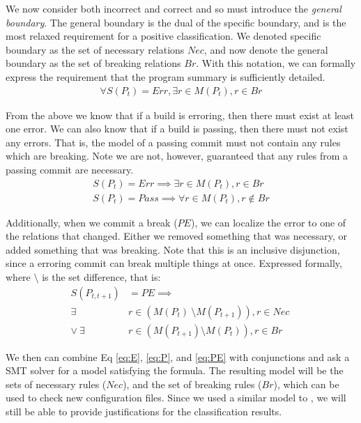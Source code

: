 We now consider both incorrect and correct 
and so must introduce the \textit{general boundary}.
The general boundary is the dual of the specific boundary, and is the most relaxed requirement for a positive classification.
We denoted specific boundary as the set of necessary relations $Nec$, and now denote the general boundary as the set of breaking relations $Br$.
With this notation, we can formally express the requirement that the program summary is sufficiently detailed.
\begin{align}
  \forall S(P_t)=Err, \exists r \in M(P_t), r \in Br \label{eq:E1}
\end{align}

From the above we know that if a build is erroring, then there must exist at least one error.
We can also know that if a build is passing, then there must not exist any errors.
That is, the model of a passing commit must not contain any rules which are breaking.
Note we are not, however, guaranteed that any rules from a passing commit are necessary.
\begin{align}
  S(P_t) = Err \implies \exists r \in  M (P_t), r \in Br \label{eq:E}\\
  S(P_t) = Pass \implies \forall r \in  M (P_t), r \notin Br \label{eq:P}
\end{align}

Additionally, when we commit a break ($PE$), we can localize the error to one of the relations that changed.
Either we removed something that was necessary, or added something that was breaking.
Note that this is an inclusive disjunction, since a erroring commit can break multiple things at once.
Expressed formally, where $\setminus$ is the set difference, that is:
\begin{align}
  S(P_{t,t+1}) &= PE \implies \nonumber \\
  \exists& r \in (M(P_{t})\ \setminus M(P_{t+1})), r \in Nec\ \nonumber \\
  \lor \ \exists& r \in (M(P_{t+1}) \setminus M(P_{t})), r \in Br \label{eq:PE}
\end{align}

We then can combine Eq \ref{eq:E}, \ref{eq:P}, and \ref{eq:PE} with
conjunctions and ask a SMT solver for a model satisfying the formula.
The resulting model will be the sets of necessary rules ($Nec$), and the set of breaking rules ($Br$), which can be used to check new configuration files.
Since we used a similar model to \app, we will still be able to provide justifications for the classification results.

